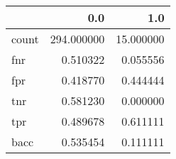 \begin{tabular}{lrr}
\toprule
{} &         0.0 &        1.0 \\
\midrule
count &  294.000000 &  15.000000 \\
fnr   &    0.510322 &   0.055556 \\
fpr   &    0.418770 &   0.444444 \\
tnr   &    0.581230 &   0.000000 \\
tpr   &    0.489678 &   0.611111 \\
bacc  &    0.535454 &   0.111111 \\
\bottomrule
\end{tabular}
